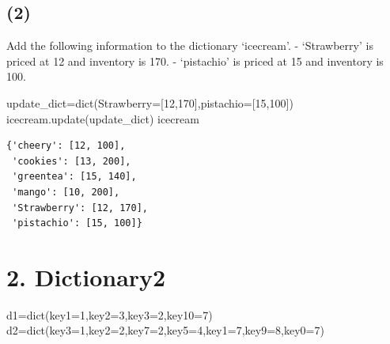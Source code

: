 \documentclass[
  a4paper,
  DIV=11,
  numbers=noendperiod]{scrreprt}
\newenvironment{Shaded}{\begin{snugshade}}{\end{snugshade}}
\newcommand{\BuiltInTok}[1]{\textcolor[rgb]{0.00,0.23,0.31}{#1}}
\newcommand{\DecValTok}[1]{\textcolor[rgb]{0.68,0.00,0.00}{#1}}
\newcommand{\NormalTok}[1]{\textcolor[rgb]{0.00,0.23,0.31}{#1}}
\newcommand{\OperatorTok}[1]{\textcolor[rgb]{0.37,0.37,0.37}{#1}}
\begin{document}
\subsection*{(2)}\label{section-1}

Add the following information to the dictionary `icecream'. -
`Strawberry' is priced at 12 and inventory is 170. - `pistachio' is
priced at 15 and inventory is 100.

\begin{Shaded}
\begin{Highlighting}[]
\NormalTok{update\_dict}\OperatorTok{=}\BuiltInTok{dict}\NormalTok{(Strawberry}\OperatorTok{=}\NormalTok{[}\DecValTok{12}\NormalTok{,}\DecValTok{170}\NormalTok{],pistachio}\OperatorTok{=}\NormalTok{[}\DecValTok{15}\NormalTok{,}\DecValTok{100}\NormalTok{])}
\NormalTok{icecream.update(update\_dict)}
\NormalTok{icecream}
\end{Highlighting}
\end{Shaded}

\begin{verbatim}
{'cheery': [12, 100],
 'cookies': [13, 200],
 'greentea': [15, 140],
 'mango': [10, 200],
 'Strawberry': [12, 170],
 'pistachio': [15, 100]}
\end{verbatim}

\section*{2. Dictionary2}\label{dictionary2}


\begin{Shaded}
\begin{Highlighting}[]
\NormalTok{d1}\OperatorTok{=}\BuiltInTok{dict}\NormalTok{(key1}\OperatorTok{=}\DecValTok{1}\NormalTok{,key2}\OperatorTok{=}\DecValTok{3}\NormalTok{,key3}\OperatorTok{=}\DecValTok{2}\NormalTok{,key10}\OperatorTok{=}\DecValTok{7}\NormalTok{)}
\NormalTok{d2}\OperatorTok{=}\BuiltInTok{dict}\NormalTok{(key3}\OperatorTok{=}\DecValTok{1}\NormalTok{,key2}\OperatorTok{=}\DecValTok{2}\NormalTok{,key7}\OperatorTok{=}\DecValTok{2}\NormalTok{,key5}\OperatorTok{=}\DecValTok{4}\NormalTok{,key1}\OperatorTok{=}\DecValTok{7}\NormalTok{,key9}\OperatorTok{=}\DecValTok{8}\NormalTok{,key0}\OperatorTok{=}\DecValTok{7}\NormalTok{)}
\end{Highlighting}
\end{Shaded}
\end{document}
